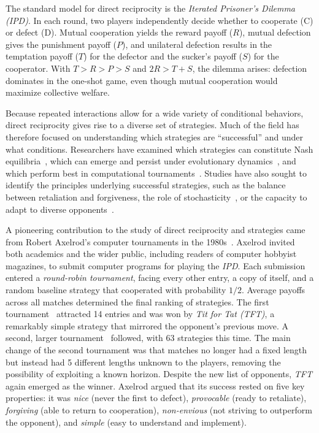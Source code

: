 \documentclass{article}
\newcommand{\TFT}{\emph{TFT}}
\newcommand{\IPD}{\emph{IPD}}
\begin{document}
The standard model for direct reciprocity is the \emph{Iterated Prisoner's
Dilemma (IPD)}. In each round, two players independently decide whether to
cooperate (C) or defect (D). Mutual cooperation yields the reward payoff ($R$),
mutual defection gives the punishment payoff ($P$), and unilateral defection
results in the temptation payoff ($T$) for the defector and the sucker's payoff
($S$) for the cooperator. With $T>R>P>S$ and $2R>T+S$, the dilemma
arises: defection dominates in the one-shot game, even though mutual
cooperation would maximize collective welfare.

Because repeated interactions allow for a wide variety of conditional behaviors,
direct reciprocity gives rise to a diverse set of strategies. Much of
the field has therefore focused on understanding which strategies are
``successful'' and under what conditions. Researchers have examined which
strategies can constitute Nash equilibria~\cite{hilbe2018partners,
murase2020five, chen2023outlearning, glynatsi2024conditional}, which can emerge
and persist under evolutionary dynamics~\cite{van2012direct, baek2016comparing,
amaral2016stochastic, hilbe2017memory, Garcia:Frontiers:2018,
laporte2023adaptive}, and which perform best in computational
tournaments~\cite{li2007design, Stewart2012, carvalho2013iterated,
gaudesi2015exploiting, Knight2017, Glynatsi:PNAS:2024}.
Studies have also sought to identify the principles underlying
successful strategies, such as the balance between retaliation and forgiveness,
the role of stochasticity~\cite{baek2016comparing}, or the capacity to adapt to diverse opponents~\cite{glynatsi2024properties}.

A pioneering contribution to the study of direct reciprocity and strategies came from Robert
Axelrod's computer tournaments in the 1980s~\cite{Axelrod1980a,Axelrod1980b,Axelrodbook}.
Axelrod invited both academics and the wider public, including readers of
computer hobbyist magazines, to submit computer programs for playing the \IPD. Each
submission entered a \emph{round-robin tournament}, facing every other entry, a
copy of itself, and a random baseline strategy that cooperated with probability
$1/2$. Average payoffs across all matches determined the final ranking of
strategies. The first tournament~\cite{Axelrod1980a} attracted 14 entries and
was won by \emph{Tit for Tat (TFT)}, a remarkably simple strategy that mirrored
the opponent's previous move. A second, larger tournament~\cite{Axelrod1980b}
followed, with 63 strategies this time. The main change of the second tournament
was that matches no longer had a
fixed length but instead had 5 different lengths unknown to the players, removing the
possibility of exploiting a known horizon. Despite the new list of opponents, \TFT{}
again emerged as the winner. Axelrod argued that its success rested on five key
properties: it was \emph{nice} (never the first to defect), \emph{provocable}
(ready to retaliate), \emph{forgiving} (able to return to cooperation),
\emph{non-envious} (not striving to outperform the opponent), and \emph{simple}
(easy to understand and implement).
\end{document}
